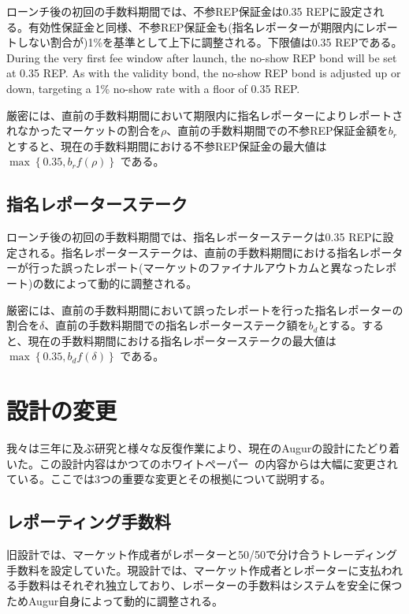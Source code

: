 \documentclass[floatfix,reprint,nofootinbib,amsmath,amssymb,epsfig,pre,floats,letterpaper,groupedaffiliation]{revtex4-1}
\theoremstyle{definition}
\theoremstyle{definition}
\theoremstyle{definition}
\begin{document}
\begin{appendix}
ローンチ後の初回の手数料期間では、不参REP保証金は0.35 REPに設定される。有効性保証金と同様、不参REP保証金も(指名レポーターが期限内にレポートしない割合が)1\%を基準として上下に調整される。下限値は0.35 REPである。
During the very first fee window after launch, the no-show REP bond will be set at 0.35 REP. As with the validity bond, the no-show REP bond is adjusted up or down, targeting a 1\% no-show rate with a floor of 0.35 REP.

厳密には、直前の手数料期間において期限内に指名レポーターによりレポートされなかったマーケットの割合を$\rho$、直前の手数料期間での不参REP保証金額を$b_r$とすると、現在の手数料期間における不参REP保証金の最大値は $\max\left\{0.35,b_r f(\rho)\right\}$ である。

\subsection{指名レポーターステーク}\label{section:bond_size_adjustment_details_designated_reporter_stake}

ローンチ後の初回の手数料期間では、指名レポーターステークは0.35 REPに設定される。指名レポーターステークは、直前の手数料期間における指名レポーターが行った誤ったレポート(マーケットのファイナルアウトカムと異なったレポート)の数によって動的に調整される。

厳密には、直前の手数料期間において誤ったレポートを行った指名レポーターの割合を$\delta$、直前の手数料期間での指名レポーターステーク額を$b_d$とする。すると、現在の手数料期間における指名レポーターステークの最大値は $\max\left\{0.35, b_d f(\delta)\right\}$ である。

\section{設計の変更}\label{section:design_changes}

我々は三年に及ぶ研究と様々な反復作業により、現在のAugurの設計にたどり着いた。この設計内容はかつてのホワイトペーパー~\cite{Peterson_2014}の内容からは大幅に変更されている。ここでは3つの重要な変更とその根拠について説明する。


\subsection{レポーティング手数料}\label{section:rewards_for_reporters_old_v_new}

旧設計では、マーケット作成者がレポーターと50/50で分け合うトレーディング手数料を設定していた。現設計では、マーケット作成者とレポーターに支払われる手数料はそれぞれ独立しており、レポーターの手数料はシステムを安全に保つためAugur自身によって動的に調整される。


\end{appendix}
\end{document}
